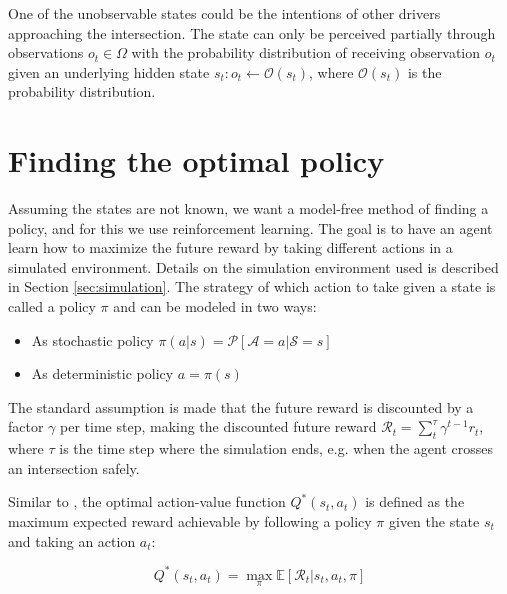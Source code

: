 One of the unobservable states could be the intentions of other drivers approaching the intersection. The state can only be perceived partially through observations $o_t\in \Omega$ with the probability distribution of receiving observation $o_t$ given an underlying hidden state $s_{t}: o_t \leftarrow \mathcal{O}(s_{t})$, where $\mathcal{O}(s_t)$ is the probability distribution. 

\section{Finding the optimal policy}
\label{sec:policy} 
Assuming the states are not known, we want a model-free method of finding a policy, and for this we use reinforcement learning. The goal is to have an agent learn how to maximize the future reward by taking different actions in a simulated environment. Details on the simulation environment used is described in Section \ref{sec:simulation}. The strategy of which action to take given a state is called a policy $\pi$ and can be modeled in two ways: 

\begin{itemize}
	\item As stochastic policy $\pi(a|s) = \mathcal{P}[\mathcal{A}=a|\mathcal{S}=s]$
	\item As deterministic policy $a = \pi(s)$
\end{itemize}
The standard assumption is made that the future reward is discounted by a factor $\gamma$ per time step, making the discounted future reward $\mathcal{R}_t = \sum_{t}^{\tau} \gamma^{t-1} r_t$, where $\tau$ is the time step where the simulation ends, e.g. when the agent crosses an intersection safely. 

Similar to \cite{MnihPlayingLearning}, the optimal action-value function $Q^*(s_t, a_t)$ is defined as the maximum expected reward achievable by following a policy $\pi$ given the state $s_t$ and taking an action $a_t$:

\begin{equation}
Q^*(s_t,a_t)= \max_{\pi} \mathbb{E}[\mathcal{R}_t | s_t, a_t, \pi]
\end{equation}


